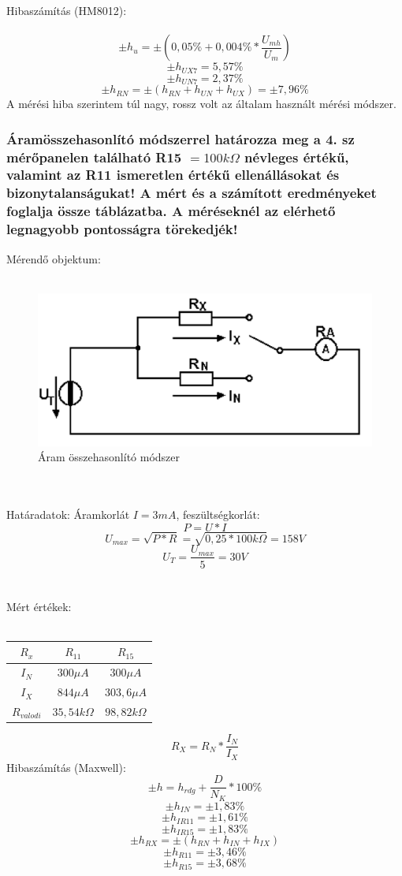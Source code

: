 \documentclass[10pt,a4paper]{article}
\begin{document}
		Hibaszámítás (HM8012):\\\\
		
		$$\pm h_u = \pm \left(0,05\% + 0,004\% * \frac{U_{mh}}{U_m}\right)$$
		$$\pm h_{UX7} = 5,57 \%$$
		$$\pm h_{UN7} = 2,37 \%$$
		$$\pm h_{RN} = \pm \left(h_{RN} + h_{UN} + h_{UX}\right) = \pm 7,96 \%$$
		A mérési hiba szerintem túl nagy, rossz volt az általam használt mérési módszer.
		\subsubsection{Áramösszehasonlító módszerrel határozza meg a 4. sz mérőpanelen
található R15 $= 100 k\Omega$ névleges értékű, valamint az R11 ismeretlen értékű
ellenállásokat és bizonytalanságukat! A mért és a számított eredményeket
foglalja össze táblázatba. A méréseknél az elérhető legnagyobb pontosságra
törekedjék!
}		Mérendő objektum:
		\\\\\begin{figure}[hbtp]
		\centering
		\includegraphics[scale=0.2]{teljes/aram_ossze.png}
		\caption{Áram összehasonlító módszer}
		\end{figure}
		\\\\Határadatok: Áramkorlát $I = 3mA$, feszültségkorlát:$$
		P= U*I$$
		$$U_{max} = \sqrt{P*R} = \sqrt{0,25 * 100 k\Omega} = 158V$$
		$$U_T = \frac{U_{max}}{5} = 30 V $$
		\\\\Mért értékek:\\\\
		\begin{tabular}{|c|c|c|}
		\hline 
		$R_x$ & $R_{11}$ & $R_{15}$ \\ 
		\hline 
		$I_N$ & $300 \mu A$ & $300 \mu A$ \\ 
		\hline 
		$I_X$ & $844 \mu A$ & $303,6 \mu A$ \\ 
		\hline 
		$R_{valodi}$ & $35,54 k\Omega$  & $98,82 k\Omega$ \\ 
		\hline 
		\end{tabular}
		$$R_X = R_N * \frac{I_N}{I_X}$$ 
		Hibaszámítás (Maxwell):
		$$\pm h = h_{rdg} + \frac{D}{N_K}*100 \%$$
		$$\pm h_{IN} = \pm 1,83 \%$$
		$$\pm h_{IR11} = \pm 1,61 \%$$
		$$\pm h_{IR15} = \pm 1,83 \%$$
		$$\pm h_{RX} = \pm \left(h_{RN} + h_{IN} + h_{IX}\right)$$
		$$\pm h_{R11} = \pm 3,46 \%$$
		$$\pm h_{R15} = \pm 3,68 \%$$
		\newpage
\end{document}
